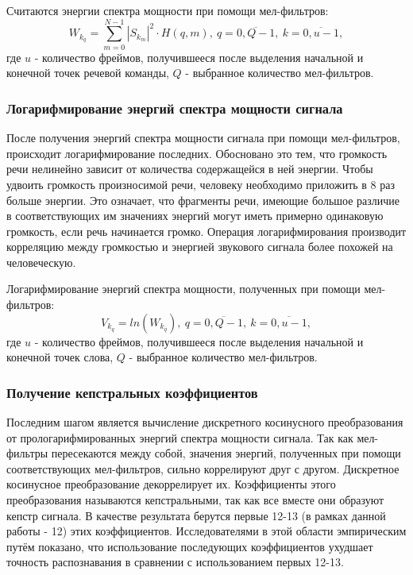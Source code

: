 Считаются энергии спектра мощности при помощи мел-фильтров:
\begin{equation}
	W_{k_q} = \sum_{m=0}^{N-1} |S_{k_m}|^2 \cdot H(q,m),~q=\overline{0,Q-1},~k=\overline{0,u-1},
\end{equation}
где $u$ - количество фреймов, получившееся после выделения начальной и конечной точек речевой команды, $Q$ - выбранное количество мел-фильтров.

\subsubsection{Логарифмирование энергий спектра мощности сигнала}
После получения энергий спектра мощности сигнала при помощи мел-фильтров, происходит логарифмирование последних. Обосновано это тем, что громкость речи нелинейно зависит от количества содержащейся в ней энергии. Чтобы удвоить громкость произносимой речи, человеку необходимо приложить в 8 раз больше энергии. Это означает, что фрагменты речи, имеющие большое различие в соответствующих им значениях энергий могут иметь примерно одинаковую громкость, если речь начинается громко. Операция логарифмирования производит корреляцию между громкостью и энергией звукового сигнала более похожей на человеческую.

Логарифмирование энергий спектра мощности, полученных при помощи мел-фильтров:
\begin{equation}
	V_{k_q} = ln(W_{k_q}),~q=\overline{0,Q-1},~k=\overline{0,u-1},
\end{equation}
где $u$ - количество фреймов, получившееся после выделения начальной и конечной точек слова, $Q$ - выбранное количество мел-фильтров.

\subsubsection{Получение кепстральных коэффициентов}
Последним шагом является вычисление дискретного косинусного преобразования от прологарифмированных энергий спектра мощности сигнала. Так как мел-фильтры пересекаются между собой, значения энергий, полученных при помощи соответствующих мел-фильтров, сильно коррелируют друг с другом. Дискретное косинусное преобразование декоррелирует их. Коэффициенты этого преобразования называются кепстральными, так как все вместе они образуют кепстр сигнала. В качестве результата берутся первые 12-13 (в рамках данной работы - 12) этих коэффициентов. Исследователями в этой области эмпирическим путём показано, что использование последующих коэффициентов ухудшает точность распознавания в сравнении с использованием первых 12-13.

